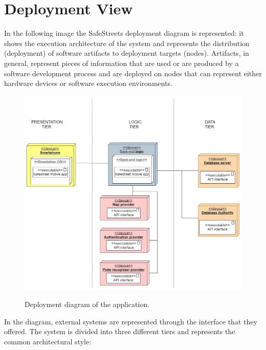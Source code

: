 \documentclass[../RASD.tex]{subfiles}
\begin{document}
    \section{Deployment View}\label{sec:deployment-view}
    In the following image the SafeStreets deployment diagram is represented: it shows the execution architecture of the system
    and represents the distribution (deployment) of software artifacts to deployment targets (nodes).
    Artifacts, in general, represent pieces of information that are used or are produced by a software development process and are deployed on nodes
    that can represent either hardware devices or software execution environments.
    \begin{figure}[H]
        \centering
        \includegraphics[scale = 1.6]{assets/deployment.png}\\[1.6 cm]
        \caption[\textit{Deployment} Diagram]{Deployment diagram of the application.}
    \end{figure}
    In the diagram, external systems are represented through the interface that they offered.
    The system is divided into three different tiers and represents the common architectural style:
\end{document}
